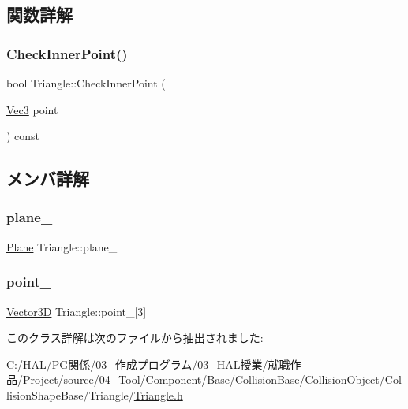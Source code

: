 \subsection{関数詳解}
\mbox{\label{class_triangle_ac5d6a4c5f2bfda5cdc56c89a294fb46e}} 
\subsubsection{\texorpdfstring{Check\+Inner\+Point()}{CheckInnerPoint()}}
{\footnotesize\ttfamily bool Triangle\+::\+Check\+Inner\+Point (\begin{DoxyParamCaption}\item[{\mbox{\hyperlink{_vector3_d_8h_ab16f59e4393f29a01ec8b9bbbabbe65d}{Vec3}}}]{point }\end{DoxyParamCaption}) const\hspace{0.3cm}{\ttfamily [inline]}}



\subsection{メンバ詳解}
\mbox{\label{class_triangle_a93586199c2c173771f2e167f477eaa70}} 
\subsubsection{\texorpdfstring{plane\+\_\+}{plane\_}}
{\footnotesize\ttfamily \mbox{\hyperlink{class_plane}{Plane}} Triangle\+::plane\+\_\+}

\mbox{\label{class_triangle_ab25f2be0ff148b58f1db904ad050353e}} 
\subsubsection{\texorpdfstring{point\+\_\+}{point\_}}
{\footnotesize\ttfamily \mbox{\hyperlink{class_vector3_d}{Vector3D}} Triangle\+::point\+\_\+\mbox{[}3\mbox{]}}



このクラス詳解は次のファイルから抽出されました\+:\begin{DoxyCompactItemize}
\item 
C\+:/\+H\+A\+L/\+P\+G関係/03\+\_\+作成プログラム/03\+\_\+\+H\+A\+L授業/就職作品/\+Project/source/04\+\_\+\+Tool/\+Component/\+Base/\+Collision\+Base/\+Collision\+Object/\+Collision\+Shape\+Base/\+Triangle/\mbox{\hyperlink{_triangle_8h}{Triangle.\+h}}\end{DoxyCompactItemize}
